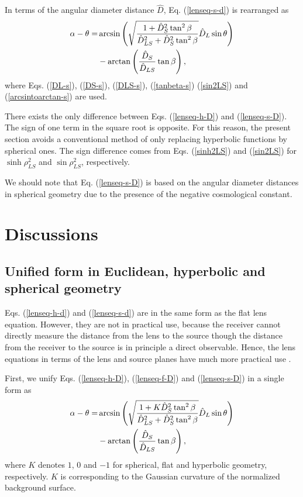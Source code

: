 \documentclass[twocolumn,showpacs,preprintnumbers,amsmath,amssymb]{revtex4-1}
\begin{document}
In terms of the angular diameter distance $\hat D$, 
Eq. (\ref{lenseq-s-d}) is rearranged as 
\begin{align}
\alpha - \theta 
=& 
\arcsin\left(
\sqrt{
\frac{1 + \hat D_S^2 \tan^2\beta}{\hat D_{LS}^2 + \hat D_S^2 \tan^2\beta}
}
\hat D_L\sin\theta\right) 
\notag\\
& 
- 
\arctan\left(\frac{\hat D_S}{\hat D_{LS}}\tan\beta\right) ,
\label{lenseq-s-D}
\end{align}
where Eqs. (\ref{DL-s}), (\ref{DS-s}), (\ref{DLS-s}), (\ref{tanbeta-s}) 
(\ref{sin2LS}) and (\ref{arcsintoarctan-s}) are used. 

There exists the only difference between 
Eqs. (\ref{lenseq-h-D}) and (\ref{lenseq-s-D}). 
The sign of one term in the square root is opposite. 
For this reason, the present section avoids a conventional method of 
only replacing hyperbolic functions by spherical ones. 
The sign difference comes from  Eqs. (\ref{sinh2LS}) and (\ref{sin2LS}) 
for $\sinh\rho_{LS}^2$ and $\sin\rho_{LS}^2$, respectively. 

We should note that Eq. (\ref{lenseq-s-D}) 
is based on the angular diameter distances 
in spherical geometry due to the presence of the negative cosmological constant. 



\section{Discussions}
\subsection{Unified form in Euclidean, hyperbolic and spherical geometry}
Eqs. (\ref{lenseq-h-d}) and (\ref{lenseq-s-d}) are in the same form 
as the flat lens equation. 
However, they are not in practical use, because the receiver cannot directly 
measure the distance from the lens to the source 
though the distance from the receiver to the source 
is in principle a direct observable. 
Hence, the lens equations in terms of the lens and source planes 
have much more practical use 
\cite{SEF, Petters, Dodelson, Keeton}. 

First, we unify Eqs. (\ref{lenseq-h-D}), (\ref{lenseq-f-D}) 
and (\ref{lenseq-s-D}) in a single form as 
\begin{align}
\alpha - \theta 
=& 
\arcsin\left(
\sqrt{
\frac{1 + K \hat D_S^2 \tan^2\beta}{\hat D_{LS}^2 + \hat D_S^2 \tan^2\beta}
}
\hat D_L\sin\theta\right) 
\notag\\
& 
- 
\arctan\left(\frac{\hat D_S}{\hat D_{LS}}\tan\beta\right) ,
\label{lenseq-all-D}
\end{align}
where $K$ denotes $1$, $0$ and $-1$ 
for spherical, flat and hyperbolic geometry, 
respectively. 
$K$ is corresponding to the Gaussian curvature 
of the normalized background surface. 
\end{document}
